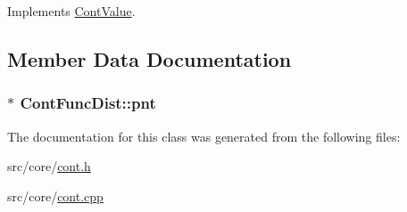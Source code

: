 Implements \hyperlink{a00086_ae3ce98084899bf1a873a1ec6bf15116e}{Cont\-Value}.



\subsection{Member Data Documentation}
\hypertarget{a00054_a16341c9754535537ff04e6dc557b1d48}{
\subsubsection[{pnt}]{$\ast$ Cont\-Func\-Dist\-::pnt\hspace{0.3cm}{\ttfamily [private]}}}\label{a00054_a16341c9754535537ff04e6dc557b1d48}


The documentation for this class was generated from the following files\-:\begin{DoxyCompactItemize}
\item 
src/core/\hyperlink{a00218}{cont.\-h}\item 
src/core/\hyperlink{a00217}{cont.\-cpp}\end{DoxyCompactItemize}
